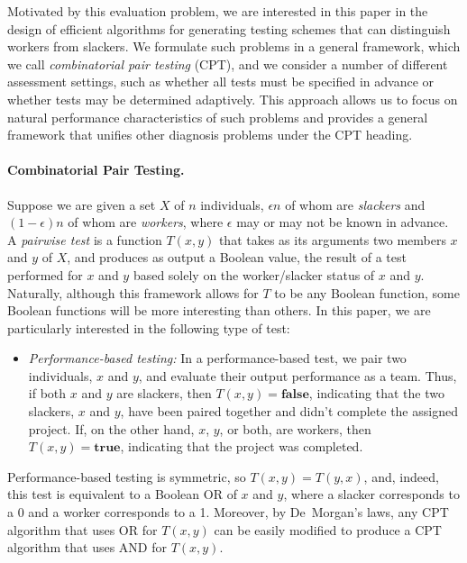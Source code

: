 \documentclass[11pt]{llncs}
\renewcommand{\subsection}[1]{\paragraph{\bf #1.}}
\begin{document}
Motivated by this evaluation problem,
we are interested in this paper in
the design of efficient algorithms for generating testing schemes that can distinguish
workers from slackers.
We formulate such problems in a general framework, which we call
\emph{combinatorial pair testing} (CPT), and we consider a number of different
assessment settings, such as whether
all tests must be specified in advance
or whether tests may be determined adaptively.
This approach allows us to focus on natural performance
characteristics of such problems and
provides a general framework that unifies other 
diagnosis problems under the CPT heading.

\subsection{Combinatorial Pair Testing}
Suppose we are given a set $X$ of $n$ individuals, $\epsilon n$ of whom
are \emph{slackers} and $(1-\epsilon)n$ of whom are \emph{workers},
where $\epsilon$ may or may not be known in advance.
A \emph{pairwise test} is a function $T(x,y)$ that takes as its arguments two members
$x$ and $y$ of $X$, 
and produces as output a Boolean value, the result of a test 
performed for $x$ and $y$ based solely on the 
worker/slacker status of $x$ and $y$.
Naturally,
although this framework allows for $T$ to be any Boolean function,
some Boolean functions will be more interesting
than others. 
In this paper,
we are particularly interested in the following type of test:
\begin{itemize}
\item
\emph{Performance-based testing:} In a performance-based test,
we pair two individuals, $x$ and $y$,
and evaluate their output performance as a team.
Thus, if both $x$ and $y$ are slackers, then
$T(x,y)=\textbf{false}$, indicating that 
the two slackers, $x$ and $y$, have been paired 
together and didn't complete the assigned project.
If, on the other hand, $x$, $y$, or both, are workers, then
$T(x,y)=\textbf{true}$, indicating that 
the project was completed.
\end{itemize}
Performance-based testing is symmetric, 
so $T(x,y)=T(y,x)$, and, indeed, this test is 
equivalent to a Boolean OR of $x$ and $y$, 
where a slacker corresponds to a 0 and a worker corresponds to a 1.
Moreover, by 
De~Morgan's laws, any CPT algorithm that uses OR for $T(x,y)$ can 
be easily modified to produce a CPT algorithm that uses AND for $T(x,y)$.
\end{document}
